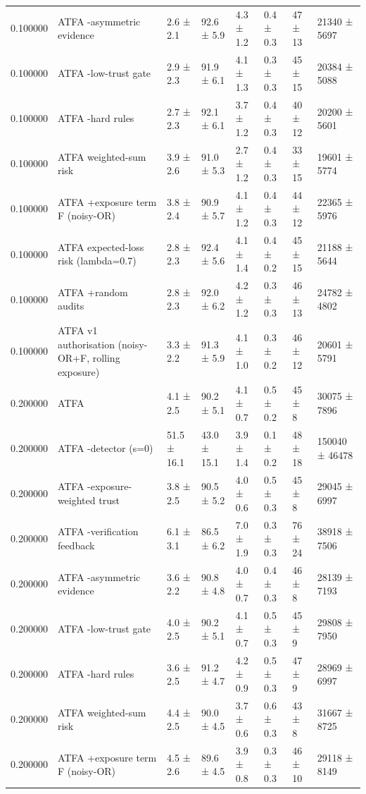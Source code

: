 \begin{tabular}{rlllllll}
0.100000 & ATFA -asymmetric evidence & 2.6 ± 2.1 & 92.6 ± 5.9 & 4.3 ± 1.2 & 0.4 ± 0.3 & 47 ± 13 & 21340 ± 5697 \\
0.100000 & ATFA -low-trust gate & 2.9 ± 2.3 & 91.9 ± 6.1 & 4.1 ± 1.3 & 0.3 ± 0.3 & 45 ± 15 & 20384 ± 5088 \\
0.100000 & ATFA -hard rules & 2.7 ± 2.3 & 92.1 ± 6.1 & 3.7 ± 1.2 & 0.4 ± 0.3 & 40 ± 12 & 20200 ± 5601 \\
0.100000 & ATFA weighted-sum risk & 3.9 ± 2.6 & 91.0 ± 5.3 & 2.7 ± 1.2 & 0.4 ± 0.3 & 33 ± 15 & 19601 ± 5774 \\
0.100000 & ATFA +exposure term F (noisy-OR) & 3.8 ± 2.4 & 90.9 ± 5.7 & 4.1 ± 1.2 & 0.4 ± 0.3 & 44 ± 12 & 22365 ± 5976 \\
0.100000 & ATFA expected-loss risk (lambda=0.7) & 2.8 ± 2.3 & 92.4 ± 5.6 & 4.1 ± 1.4 & 0.4 ± 0.2 & 45 ± 15 & 21188 ± 5644 \\
0.100000 & ATFA +random audits & 2.8 ± 2.3 & 92.0 ± 6.2 & 4.2 ± 1.2 & 0.3 ± 0.3 & 46 ± 13 & 24782 ± 4802 \\
0.100000 & ATFA v1 authorisation (noisy-OR+F, rolling exposure) & 3.3 ± 2.2 & 91.3 ± 5.9 & 4.1 ± 1.0 & 0.3 ± 0.2 & 46 ± 12 & 20601 ± 5791 \\
0.200000 & ATFA & 4.1 ± 2.5 & 90.2 ± 5.1 & 4.1 ± 0.7 & 0.5 ± 0.2 & 45 ± 8 & 30075 ± 7896 \\
0.200000 & ATFA -detector (s=0) & 51.5 ± 16.1 & 43.0 ± 15.1 & 3.9 ± 1.4 & 0.1 ± 0.2 & 48 ± 18 & 150040 ± 46478 \\
0.200000 & ATFA -exposure-weighted trust & 3.8 ± 2.5 & 90.5 ± 5.2 & 4.0 ± 0.6 & 0.5 ± 0.3 & 45 ± 8 & 29045 ± 6997 \\
0.200000 & ATFA -verification feedback & 6.1 ± 3.1 & 86.5 ± 6.2 & 7.0 ± 1.9 & 0.3 ± 0.3 & 76 ± 24 & 38918 ± 7506 \\
0.200000 & ATFA -asymmetric evidence & 3.6 ± 2.2 & 90.8 ± 4.8 & 4.0 ± 0.7 & 0.4 ± 0.3 & 46 ± 8 & 28139 ± 7193 \\
0.200000 & ATFA -low-trust gate & 4.0 ± 2.5 & 90.2 ± 5.1 & 4.1 ± 0.7 & 0.5 ± 0.3 & 45 ± 9 & 29808 ± 7950 \\
0.200000 & ATFA -hard rules & 3.6 ± 2.5 & 91.2 ± 4.7 & 4.2 ± 0.9 & 0.5 ± 0.3 & 47 ± 9 & 28969 ± 6997 \\
0.200000 & ATFA weighted-sum risk & 4.4 ± 2.5 & 90.0 ± 4.5 & 3.7 ± 0.6 & 0.6 ± 0.3 & 43 ± 8 & 31667 ± 8725 \\
0.200000 & ATFA +exposure term F (noisy-OR) & 4.5 ± 2.6 & 89.6 ± 4.5 & 3.9 ± 0.8 & 0.3 ± 0.3 & 46 ± 10 & 29118 ± 8149 \\

\end{tabular}
